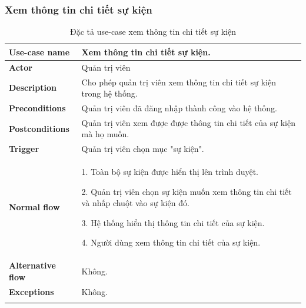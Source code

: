 \subsubsection{Xem thông tin chi tiết sự kiện}
{
    \setlength\extrarowheight{6pt}
    \begin{longtable}{| p{} | p{} |}
        \hline
        \textbf{Use-case name}
         &
        Xem thông tin chi tiết sự kiện.
        \\
        \hline
        \textbf{Actor}
         &
        Quản trị viên
        \\
        \hline
        \textbf{Description}
         &
        Cho phép quản trị viên xem  thông tin chi tiết sự kiện trong hệ thống.
        \\
        \hline
        \textbf{Preconditions}
         &
        Quản trị viên đã đăng nhập thành công vào hệ thống.
        \\
        \hline
        \textbf{Postconditions}
         &
        Quản trị viên xem được được thông tin chi tiết của sự kiện mà họ muốn.
        \\
        \hline
        \textbf{Trigger}
         &
        Quản trị viên chọn mục "sự kiện".
        \\
        \hline
        \begin{flushleft}
            \textbf{Normal flow}
        \end{flushleft}
         &
        1. Toàn bộ sự kiện được hiển thị lên trình duyệt.

        2.  Quản trị viên chọn sự kiện muốn xem thông tin chi tiết và nhấp chuột vào sự kiện đó.

        3.  Hệ thống hiển thị thông tin chi tiết của sự kiện.

        4. Người dùng xem thông tin chi tiết của sự kiện.
        \\
        \hline
        \textbf{Alternative flow}
         &
        Không.
        \\
        \hline
        \textbf{Exceptions}
         &
        Không.
        \\
        \hline
        \caption{Đặc tả use-case xem thông tin chi tiết sự kiện}
    \end{longtable}
}
